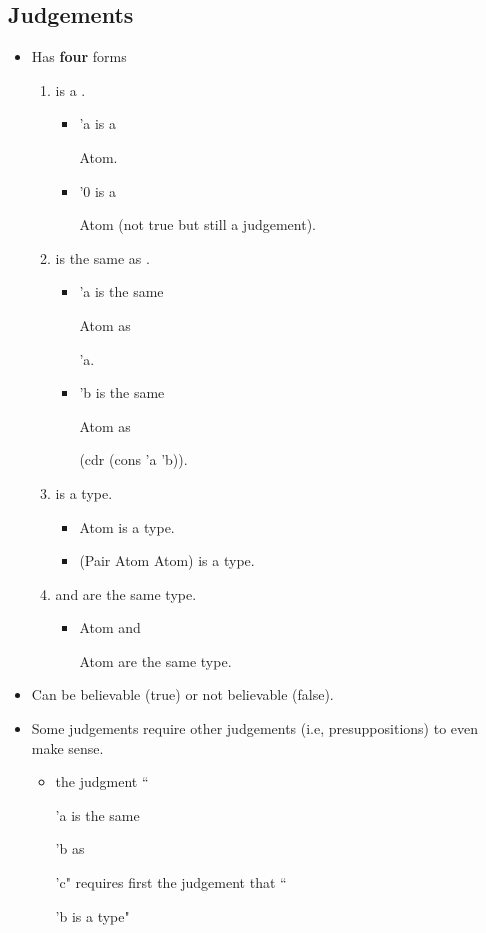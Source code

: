 \documentclass{article}
\newcommand*{\SavedLstInline}{}
\DeclareRobustCommand*{\lstinline}{%
  \ifmmode
    \let\SavedBGroup\bgroup
    \def\bgroup{%
      \let\bgroup\SavedBGroup
      \hbox\bgroup
    }%
  \fi
  \SavedLstInline
}
\begin{document}
\subsection{Judgements}
\begin{itemize}
    \item Has \textbf{four} forms
        \begin{enumerate}
            \item \underline{\phantom{blank}} is a \underline{\phantom{blank}}.
                \begin{itemize}
                    \item \lstinline{'a} is a \lstinline{Atom}.
                    \item \lstinline{'0} is a \lstinline{Atom} (not true but still a judgement).
                \end{itemize}
            \item \underline{\phantom{blank}} is the same \underline{\phantom{blank}} as \underline{\phantom{blank}}.
                \begin{itemize}
                    \item \lstinline{'a} is the same \lstinline{Atom} as \lstinline{'a}.
                    \item \lstinline{'b} is the same \lstinline{Atom} as \lstinline{(cdr (cons 'a 'b))}.
                \end{itemize}
            \item \underline{\phantom{blank}} is a type.
                \begin{itemize}
                    \item \lstinline{Atom} is a type.
                    \item \lstinline{(Pair Atom Atom)} is a type.
                \end{itemize}
            \item \underline{\phantom{blank}} and \underline{\phantom{blank}} are the same type.
                \begin{itemize}
                    \item \lstinline{Atom} and \lstinline{Atom} are the same type.
                \end{itemize}
        \end{enumerate}
    \item Can be believable (true) or not believable (false).
    \item Some judgements require other judgements (i.e, presuppositions) to even make sense.
        \begin{itemize}
            \item the judgment ``\lstinline{'a} is the same \lstinline{'b} as \lstinline{'c}" requires first the judgement that ``\lstinline{'b} is a type"
        \end{itemize}
\end{itemize}
\end{document}
